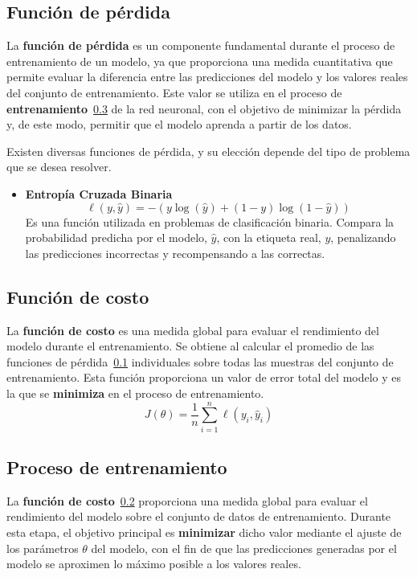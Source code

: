 
\subsection{Función de pérdida}
\label{subsec:FuncionPerdida}
La \textbf{función de pérdida} es un componente fundamental durante el proceso de entrenamiento de un modelo, ya que proporciona una medida cuantitativa que permite evaluar la diferencia entre las predicciones del modelo y los valores reales del conjunto de entrenamiento. Este valor se utiliza en el proceso de \textbf{entrenamiento}~\ref{subsec:Entrenamiento} de la red neuronal, con el objetivo de minimizar la pérdida y, de este modo, permitir que el modelo aprenda a partir de los datos.

Existen diversas funciones de pérdida, y su elección depende del tipo de problema que se desea resolver.
\begin{itemize}
    \item \textbf{Entropía Cruzada Binaria}
        \[\ell(y, \hat{y}) = -(y \log(\hat{y}) + (1 - y) \log(1 - \hat{y}))\]
       Es una función utilizada en problemas de clasificación binaria. Compara la probabilidad predicha por el modelo, \(\hat{y}\), con la etiqueta real, \(y\), penalizando las predicciones incorrectas y recompensando a las correctas.
\end{itemize}

\subsection{Función de costo}
\label{subsec:FuncionCosto}
La \textbf{función de costo} es una medida global para evaluar el rendimiento del modelo durante el entrenamiento. Se obtiene al calcular el promedio de las funciones de pérdida~\ref{subsec:FuncionPerdida} individuales sobre todas las muestras del conjunto de entrenamiento. Esta función proporciona un valor de error total del modelo y es la que se \textbf{minimiza} en el proceso de entrenamiento.
\[J(\theta) = \frac{1}{n} \sum_{i=1}^{n} \ell(y_i, \hat{y}_i)\]

\subsection{Proceso de entrenamiento}
\label{subsec:Entrenamiento}
La \textbf{función de costo}~\ref{subsec:FuncionCosto} proporciona una medida global para evaluar el rendimiento del modelo sobre el conjunto de datos de entrenamiento. Durante esta etapa, el objetivo principal es \textbf{minimizar} dicho valor mediante el ajuste de los parámetros \(\theta\) del modelo, con el fin de que las predicciones generadas por el modelo se aproximen lo máximo posible a los valores reales.


